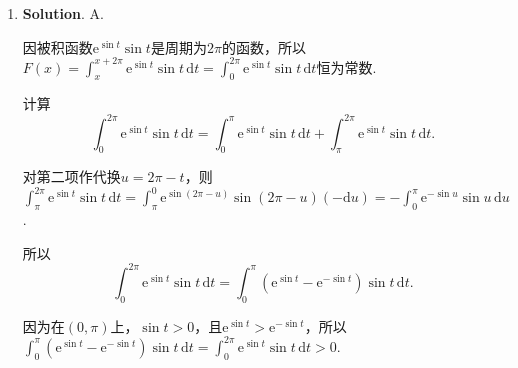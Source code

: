 \documentclass[../Main.tex]{subfiles}
\begin{document}
\begin{enumerate}
          故曲线$y=x\ln\left(\mathrm{e}+\frac{1}{x}\right)$的渐近线条数为1.

    \item \textbf{Solution}. A.

          因被积函数$\mathrm{e}^{\sin t}\sin t$是周期为$2\pi$的函数，所以$F(x)=\int^{x+2\pi}
              _{x}\mathrm{e}^{\sin t}\sin t\,\mathrm{d}t=\int_{0}^{2\pi}\mathrm{e}^{\sin t}
              \sin t\,\mathrm{d}t$恒为常数.

          计算
          \[
              \int_{0}^{2\pi}\mathrm{e}^{\sin t}\sin t\,\mathrm{d}t =\int_{0}^{\pi}\mathrm{e}
              ^{\sin t}\sin t\,\mathrm{d}t+\int_{\pi}^{2\pi}\mathrm{e}^{\sin t}\sin t\,\mathrm{d}
              t.
          \]

          对第二项作代换$u=2\pi-t$，则$\int_{\pi}^{2\pi}\mathrm{e}^{\sin t}\sin t\,\mathrm{d}
              t=\int_{\pi}^{0}\mathrm{e}^{\sin(2\pi-u)}\sin(2\pi-u)(-\mathrm{d}u)=-\int_{0}
              ^{\pi}\mathrm{e}^{-\sin u}\sin u\,\mathrm{d}u$.

          所以
          \[
              \int_{0}^{2\pi}\mathrm{e}^{\sin t}\sin t\,\mathrm{d}t = \int_{0}^{\pi}\left
              (\mathrm{e}^{\sin t}-\mathrm{e}^{-\sin t}\right)\sin t\,\mathrm{d}t.
          \]

          因为在$(0,\pi)$上，$\sin t>0$，且$\mathrm{e}^{\sin t}>\mathrm{e}^{-\sin t}$，所以$\int
              _{0}^{\pi}\left(\mathrm{e}^{\sin t}-\mathrm{e}^{-\sin t}\right)\sin t\,\mathrm{d}
              t=\int_{0}^{2\pi}\mathrm{e}^{\sin t}\sin t\,\mathrm{d}t>0$.
\end{enumerate}
\end{document}
